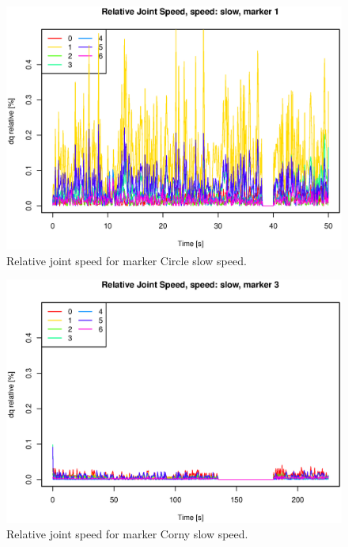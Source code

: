 \begin{figure}[H]\centering\includegraphics[width=\fullImageWidth]{graphics/rovi_robot_joint_speed_slow_marker1.eps}    \caption{Relative joint speed for marker Circle slow speed.  }\label{fig:rovi_joint_speed_S_Circle} \end{figure}
\begin{figure}[H]\centering\includegraphics[width=\fullImageWidth]{graphics/rovi_robot_joint_speed_slow_marker3.eps}    \caption{Relative joint speed for marker Corny  slow speed.  }\label{fig:rovi_joint_speed_S_Corny } \end{figure}